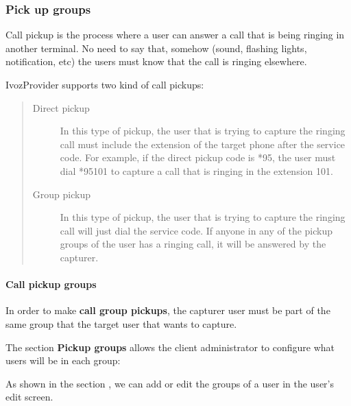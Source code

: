 \documentclass[letterpaper,10pt,english]{sphinxmanual}
\begin{document}
\subsubsection{Pick up groups}
\label{administration_portal/client/vpbx/user_configuration/pick_up_groups:capture-groups}\label{administration_portal/client/vpbx/user_configuration/pick_up_groups:pick-up-groups}\label{administration_portal/client/vpbx/user_configuration/pick_up_groups::doc}
Call pickup is the process where a user can answer a call that is being ringing
in another terminal. No need to say that, somehow (sound, flashing lights,
notification, etc) the users must know that the call is ringing elsewhere.

IvozProvider supports two kind of call pickups:
\begin{quote}
\begin{description}
\item[{Direct pickup}] \leavevmode
In this type of pickup, the user that is trying to capture the ringing
call must include the extension of the target phone after the service
code. For example, if the direct pickup code is *95, the user must
dial *95101 to capture a call that is ringing in the extension 101.

\item[{Group pickup}] \leavevmode
In this type of pickup, the user that is trying to capture the ringing
call will just dial the service code. If anyone in any of the pickup
groups of the user has a ringing call, it will be answered by the
capturer.

\end{description}
\end{quote}


\paragraph{Call pickup groups}
\label{administration_portal/client/vpbx/user_configuration/pick_up_groups:call-pickup-groups}
In order to make \textbf{call group pickups}, the capturer user must be part of the
same group that the target user that wants to capture.

The section \textbf{Pickup groups} allows the client administrator to configure
what users will be in each group:

As shown in the section {\hyperref[administration_portal/client/vpbx/users:users]{}}, we can add or edit the groups of a user
in the user's edit screen.
\end{document}
